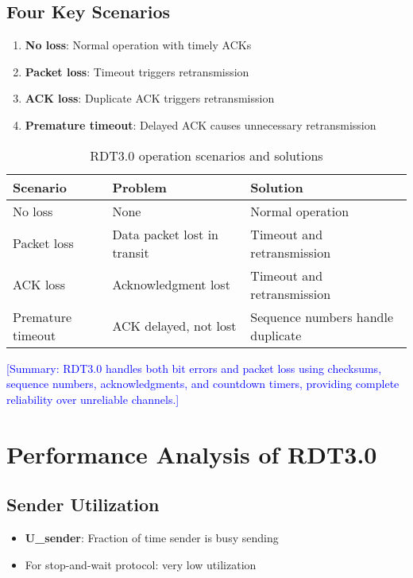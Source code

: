 \documentclass[12pt]{article}
\begin{document}
\subsection{Four Key Scenarios}
\begin{enumerate}
    \item \textbf{No loss}: Normal operation with timely ACKs
    \item \textbf{Packet loss}: Timeout triggers retransmission
    \item \textbf{ACK loss}: Duplicate ACK triggers retransmission
    \item \textbf{Premature timeout}: Delayed ACK causes unnecessary retransmission
\end{enumerate}

\begin{table}[h]
    \centering
    \begin{tabular}{p{}p{}p{}}
        \toprule
        \textbf{Scenario} & \textbf{Problem}            & \textbf{Solution}                 \\
        \midrule
        No loss           & None                        & Normal operation                  \\
        Packet loss       & Data packet lost in transit & Timeout and retransmission        \\
        ACK loss          & Acknowledgment lost         & Timeout and retransmission        \\
        Premature timeout & ACK delayed, not lost       & Sequence numbers handle duplicate \\
        \bottomrule
    \end{tabular}
    \caption{RDT3.0 operation scenarios and solutions}
    \label{tab:rdt3_scenarios}
\end{table}

\textcolor{blue}{[Summary: RDT3.0 handles both bit errors and packet loss using checksums, sequence numbers, acknowledgments, and countdown timers, providing complete reliability over unreliable channels.]}

\section{Performance Analysis of RDT3.0}

\subsection{Sender Utilization}
\begin{itemize}
    \item \textbf{U\_sender}: Fraction of time sender is busy sending
    \item For stop-and-wait protocol: very low utilization
\end{itemize}
\end{document}

